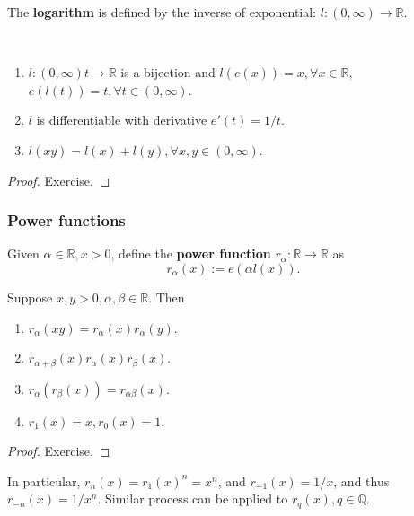 \begin{definition}
    The \textbf{logarithm} is defined by the inverse of exponential: $ l:(0,\infty )\to \mathbb{R}  $.
\end{definition}
\begin{theorem}\label{thm:4.8}\
    \begin{enumerate}
        \item $ l:(0,\infty )t\to \mathbb{R}  $ is a bijection and $ l(e(x))=x, \forall x\in \mathbb{R} $, $ e(l(t))=t,\forall t\in (0,\infty ) $.
        \item $l$ is differentiable with derivative $ e'(t)=1/t $.
        \item $ l(xy)=l(x)+l(y),\forall x,y\in (0,\infty ) $.
    \end{enumerate}
\end{theorem}
\begin{proof}
    Exercise.
\end{proof}

\subsubsection*{Power functions}

\begin{definition}
    Given $ \alpha\in \mathbb{R}, x>0 $, define the \textbf{power function} $ r_\alpha:\mathbb{R} \to \mathbb{R} $ as 
    \[
        r_\alpha(x) := e(\alpha l(x)).
    \]
\end{definition}
\begin{theorem}\label{thm:4.9}
    Suppose $ x,y>0,\alpha,\beta\in \mathbb{R} $. Then 
    \begin{enumerate}
        \item $ r_\alpha(xy)=r_\alpha(x)r_\alpha(y) $.
        \item $ r_{\alpha+\beta}(x)r_\alpha(x)r_\beta(x) $.
        \item $ r_\alpha(r_\beta(x))=r_{\alpha\beta}(x) $.
        \item $ r_1(x)=x,r_0(x)=1 $.
    \end{enumerate}
\end{theorem}
\begin{proof}
    Exercise.
\end{proof}

In particular, $ r_n(x)=r_1(x)^n=x^n $, and $ r_{-1}(x)=1/x $, and thus $ r_{-n}(x)=1/x^n $. Similar process can be applied to $ r_q(x),q\in \mathbb{Q} $.

